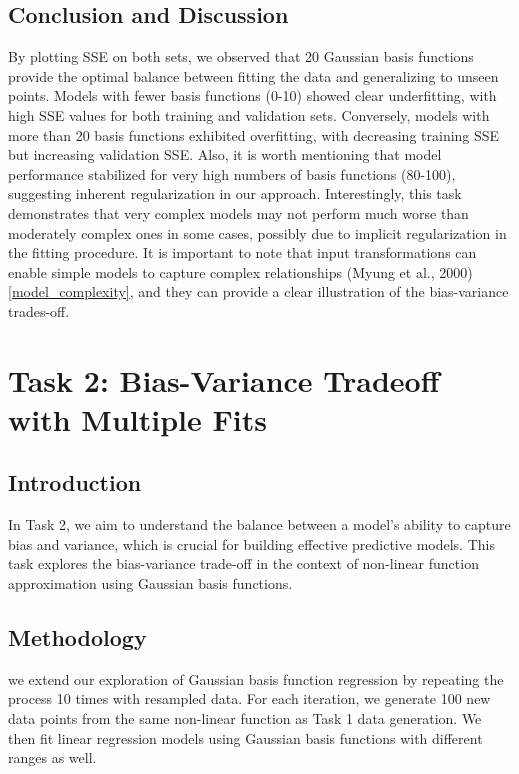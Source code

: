 \documentclass{article}
\begin{document}
\subsection{Conclusion and Discussion}
By plotting SSE on both sets, we observed that 20 Gaussian basis functions provide the optimal balance between fitting the data and generalizing to unseen points. Models with fewer basis functions (0-10) showed clear underfitting, with high SSE values for both training and validation sets. Conversely, models with more than 20 basis functions exhibited overfitting, with decreasing training SSE but increasing validation SSE. Also, it is worth mentioning that model performance stabilized for very high numbers of basis functions (80-100), suggesting inherent regularization in our approach. Interestingly, this task demonstrates that very complex models may not perform much worse than moderately complex ones in some cases, possibly due to implicit regularization in the fitting procedure. It is important to note that input transformations can enable simple models to capture complex relationships (Myung et al., 2000)\ref{model_complexity}, and they can provide a clear illustration of the bias-variance trades-off.


\section{Task 2: Bias-Variance Tradeoff with Multiple Fits}

\subsection{Introduction}
In Task 2, we aim to understand the balance between a model's ability to capture bias and variance, which is crucial for building effective predictive models. This task explores the bias-variance trade-off in the context of non-linear function approximation using Gaussian basis functions.

\subsection{Methodology}
we extend our exploration of Gaussian basis function regression by repeating the process 10 times with resampled data. For each iteration, we generate 100 new data points from the same non-linear function as Task 1 data generation. We then fit linear regression models using Gaussian basis functions with different ranges as well.
\end{document}
